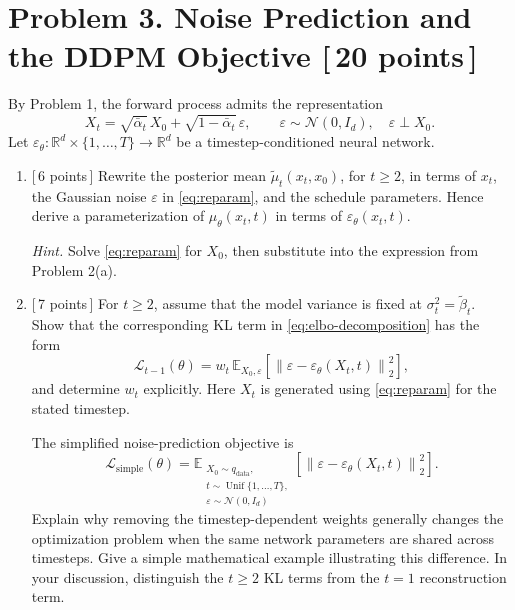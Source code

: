 \documentclass[11pt]{article}
\newcommand{\R}{\mathbb{R}}
\newcommand{\E}{\mathbb{E}}
\newcommand{\N}{\mathcal{N}}
\newcommand{\hint}[1]{\par\vspace{2pt}\noindent\textit{Hint.} #1\par}
\newcommand{\pts}[1]{\hfill\textnormal{[\,#1 points\,]}}
\begin{document}
\newpage
\section*{Problem 3. Noise Prediction and the DDPM Objective \pts{20}}

By Problem 1, the forward process admits the representation
\begin{equation}\label{eq:reparam}
  X_t=\sqrt{\bar\alpha_t}\,X_0
      +\sqrt{1-\bar\alpha_t}\,\varepsilon,
  \qquad \varepsilon\sim\N(0,I_d),\quad \varepsilon\perp X_0.
\end{equation}
Let \(\varepsilon_\theta:\R^d\times\{1,\ldots,T\}\to\R^d\)
be a timestep-conditioned neural network.

\begin{enumerate}
  \item \pts{6} Rewrite the posterior mean \(\widetilde\mu_t(x_t,x_0)\), for \(t\ge2\),
  in terms of \(x_t\), the Gaussian noise \(\varepsilon\) in \eqref{eq:reparam},
  and the schedule parameters. Hence derive a parameterization of
  \(\mu_\theta(x_t,t)\) in terms of \(\varepsilon_\theta(x_t,t)\).

  \hint{Solve \eqref{eq:reparam} for \(X_0\), then substitute into the expression
  from Problem 2(a).}

  \item \pts{7} For \(t\ge2\), assume that the model variance is fixed at
  \(\sigma_t^2=\widetilde\beta_t\). Show that the corresponding KL term in
  \eqref{eq:elbo-decomposition} has the form
  \begin{equation}\label{eq:weighted-loss}
     \mathcal L_{t-1}(\theta)
     =w_t\,\E_{X_0,\varepsilon}\!\left[
       \left\|\varepsilon-
       \varepsilon_\theta(X_t,t)\right\|_2^2
     \right],
  \end{equation}
  and determine \(w_t\) explicitly. Here \(X_t\) is generated using
  \eqref{eq:reparam} for the stated timestep.

  The simplified noise-prediction objective is
  \begin{equation}\label{eq:simple-loss}
    \mathcal L_{\mathrm{simple}}(\theta)
    =\E_{\substack{X_0\sim q_{\mathrm{data}},\\
             t\sim\operatorname{Unif}\{1,\ldots,T\},\\
             \varepsilon\sim\N(0,I_d)}}\!\left[
      \left\|\varepsilon-
      \varepsilon_\theta(X_t,t)\right\|_2^2
    \right].
  \end{equation}
  Explain why removing the timestep-dependent weights generally changes the optimization
  problem when the same network parameters are shared across timesteps. Give a simple
  mathematical example illustrating this difference. In your discussion, distinguish the
  \(t\ge2\) KL terms from the \(t=1\) reconstruction term.


\end{enumerate}
\end{document}

